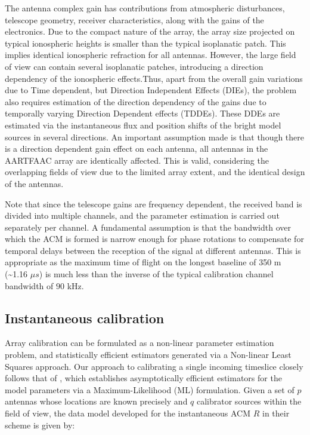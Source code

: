 \documentclass{aa}
\begin{document}
The antenna complex gain has contributions from atmospheric disturbances,
telescope geometry, receiver characteristics, along with the gains
of the electronics. Due to the compact nature of the array, the array
size projected on typical ionospheric heights is smaller than the
typical isoplanatic patch. This implies identical ionospheric refraction
for all antennas. However, the large field of view can contain several
isoplanatic patches, introducing a direction dependency of the ionospheric
effects.Thus, apart from the overall gain variations due to Time dependent,
but Direction Independent Effects (DIEs), the problem also requires
estimation of the direction dependency of the gains due to temporally
varying Direction Dependent effects (TDDEs). These DDEs are estimated
via the instantaneous flux and position shifts of the bright model
sources in several directions. An important assumption made is that
though there is a direction dependent gain effect on each antenna,
all antennas in the AARTFAAC array are identically affected. This
is valid, considering the overlapping fields of view due to the limited
array extent, and the identical design of the antennas.

Note that since the telescope gains are frequency dependent, the received
band is divided into multiple channels, and the parameter estimation
is carried out separately per channel. A fundamental assumption is
that the bandwidth over which the ACM is formed is narrow enough for
phase rotations to compensate for temporal delays between the reception
of the signal at different antennas\cite{zatman1998narrow}. This
is appropriate as the maximum time of flight on the longest baseline
of 350 m (\textasciitilde{}1.16 $\mu s$) is much less than the inverse
of the typical calibration channel bandwidth of $90$ kHz. 


\subsection{Instantaneous calibration}

Array calibration can be formulated as a non-linear parameter estimation
problem, and statistically efficient estimators generated via a Non-linear
Least Squares approach. Our approach to calibrating a single incoming
timeslice closely follows that of \cite{wijnholds2009multisource},
which establishes asymptotically efficient estimators for the model
parameters via a Maximum-Likelihood (ML) formulation. Given a set
of $p$ antennas whose locations are known precisely and $q$ calibrator
sources within the field of view, the data model developed for the
instantaneous ACM $R$ in their scheme is given by:
\end{document}

